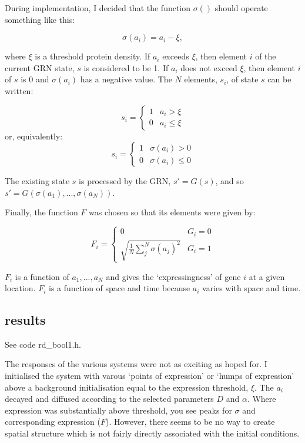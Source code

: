 \documentclass[11pt, a4paper]{article}
\newcommand{\code}[1]{\textsf{#1}}
\begin{document}
During implementation, I decided that the function $\sigma()$ should
operate something like this:

\begin{equation} \label{eq:sigma}
\sigma(a_i) = a_i - \xi,
\end{equation}

where $\xi$ is a threshold protein density. If $a_i$ exceeds $\xi$, then
element $i$ of the current GRN state, $s$ is considered to be 1. If $a_i$ does
not exceed $\xi$, then element $i$ of $s$ is 0 and $\sigma(a_i)$ has a
negative value. The $N$ elements, $s_i$, of state $s$ can be written:

\begin{equation} \label{eq:s}
s_i = \begin{cases}
      1 & a_i > \xi \\
      0 & a_i \leq \xi
      \end{cases}
\end{equation}
or, equivalently:
\begin{equation} \label{eq:s2}
s_i = \begin{cases}
      1 & \sigma(a_i) > 0 \\
      0 & \sigma(a_i) \leq 0
      \end{cases}
\end{equation}

The existing state $s$ is processed by the GRN, $s' = G(s)$, and so $s' = G(\sigma(a_1),...,\sigma(a_N))$.

Finally, the function $F$ was chosen so that its elements were given by:

\begin{equation} \label{eq:F}
F_i = \begin{cases}
0 & G_i = 0 \\
\sqrt{\frac{1}{N}\sum_j^N \sigma(a_j)^2}  & G_i = 1
\end{cases}
\end{equation}

$F_i$ is a function of $a_1,...,a_N$ and gives the `expressingness' of gene
$i$ at a given location. $F_i$ is a function of space and time because $a_i$
varies with space and time.

\subsection{results}

See code \code{rd\_bool1.h}.

The responses of the various systems were not as exciting as hoped for. I
initialised the system with varous `points of expression' or `humps of
expression' above a background initialisation equal to the expression
threshold, $\xi$. The $a_i$ decayed and diffused according to the selected
parameters $D$ and $\alpha$. Where expression was substantially above
threshold, you see peaks for $\sigma$ and corresponding expression
($F$). However, there seems to be no way to create spatial structure which
is not fairly directly associated with the initial conditions.
\end{document}
